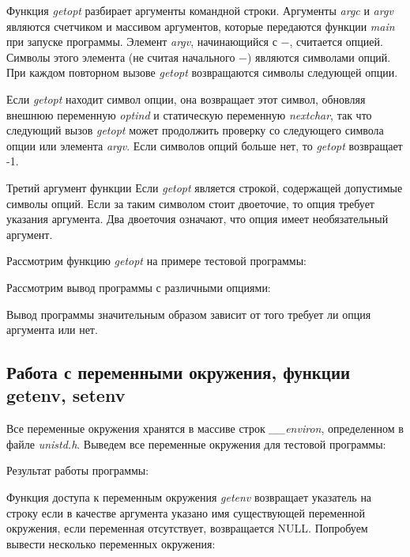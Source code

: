 \documentclass[14pt,a4paper,report]{report}
\begin{document}
Функция \emph{getopt} разбирает аргументы командной строки. Аргументы \emph{argc} и \emph{argv} являются счетчиком и массивом аргументов, которые передаются функции \emph{main} при запуске программы. Элемент \emph{argv}, начинающийся с $-$, считается опцией. Символы этого элемента (не считая начального $-$) являются символами опций. При каждом повторном вызове \emph{getopt} возвращаются символы следующей опции. 

Если \emph{getopt} находит символ опции, она возвращает этот символ, обновляя внешнюю переменную \emph{optind} и статическую переменную \emph{nextchar}, так что следующий вызов \emph{getopt} может продолжить проверку со следующего символа опции или элемента \emph{argv}. Если символов опций больше нет, то \emph{getopt} возвращает -1.

Третий аргумент функции Если \emph{getopt} является строкой, содержащей допустимые символы опций. Если за таким символом стоит двоеточие, то опция требует указания аргумента. Два двоеточия означают, что опция имеет необязательный аргумент.

Рассмотрим функцию \emph{getopt} на примере тестовой программы:



Рассмотрим вывод программы с различными опциями:



Вывод программы значительным образом зависит от того требует ли опция аргумента или нет.

\clearpage

\subsection{Работа с переменными окружения, функции getenv, setenv}

Все переменные окружения хранятся в массиве строк \emph{\_\_environ}, определенном в файле \emph{unistd.h}. Выведем все переменные окружения для тестовой программы:



Результат работы программы:



Функция доступа к переменным окружения \emph{getenv} возвращает указатель на строку если в качестве аргумента указано имя существующей переменной окружения, если переменная отсутствует, возвращается NULL. Попробуем вывести несколько переменных окружения:
\end{document}
